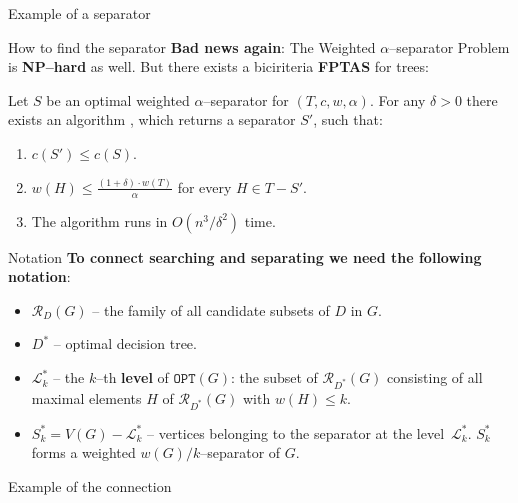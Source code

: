 \documentclass{beamer}
\newcommand{\br}[1]{\mathopen{}\left( #1 \right)}
\newcommand{\OPT}{\texttt{OPT}}
\begin{document}
\begin{frame}{Example of a separator}
    
\end{frame}

\begin{frame}{How to find the separator}
\textbf{Bad news again}: The Weighted $\alpha$–separator Problem is \textbf{NP–hard} as well.
\pause
But there exists a biciriteria \textbf{FPTAS} for trees:
\pause
\begin{theorem}
    Let $S$ be an optimal weighted $\alpha$–separator for $\br{T,c,w,\alpha}$. For any $\delta>0$ there exists an algorithm \FSeparatorFPTAS, which returns a separator $S'$, such that:
    \begin{enumerate}
        \pause
        \item $c\br{S'}\leq c\br{S}$.
        \pause
        \item $w\br{H}\leq \frac{\br{1+\delta}\cdot w\br{T}}{\alpha}$ for every $H\in T-S'$.
        \pause
        \item The algorithm runs in $O\br{n^3/\delta^2}$ time.
    \end{enumerate}
\end{theorem}

\end{frame}
\begin{frame}{Notation}
    \textbf{To connect searching and separating we need the following notation}:
    \begin{itemize}
        \item $\mathcal{R}_D\br{G}$ – 
the family of all candidate subsets of $D$ in $G$.
        \pause
        \item $D^*$ – optimal decision tree.
        \pause
        \item $\mathcal{L}_{k}^*$ – the $k$–th \textbf{level} of $\OPT\br{G}$: the subset of $\mathcal{R}_{D^*}\br{G}$
        consisting of all maximal elements $H$ of $\mathcal{R}_{D^*}\br{G}$ with $w\br{H} \leq k$.  
        \pause
        \item $S_{k}^* = V\br{G} - \mathcal{L}_{k}^*$ – vertices belonging to the separator at the level~$\mathcal{L}_{k}^*$. $S_{k}^*$ forms a weighted $w\br{G}/k$–separator of $G$.
    \end{itemize}

\end{frame}
\begin{frame}{Example of the connection}

\end{frame}
\end{document}
